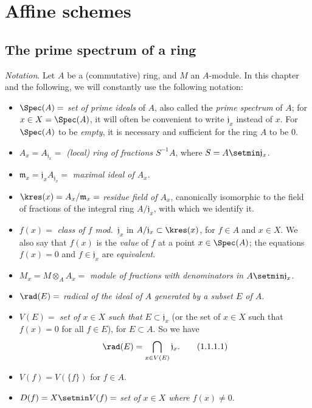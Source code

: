 \setcounter{section}{0}
\section{Affine schemes}
\label{section:I.1}

\setcounter{subsection}{0}
\subsection{The prime spectrum of a ring}
\label{subsection:I.1.1}

\begin{env}[1.1.1]
\label{I.1.1.1}
\emph{Notation}. Let $A$ be a (commutative) ring, and $M$ an $A$-module.
In this chapter and the following, we will constantly use the following notation:
\begin{itemize}
  \item $\Spec(A)=$ \emph{set of prime ideals} of $A$, also called the \emph{prime spectrum} of $A$; for $x\in X=\Spec(A)$, it will often be convenient to write $\mathfrak{j}_x$ instead of $x$.
    For $\Spec(A)$ to be \emph{empty}, it is necessary and sufficient for the ring $A$ to be $0$.
  \item $A_x=A_{\mathfrak{j}_x}=$ \emph{(local) ring of fractions $S^{-1}A$}, where $S=A\setmin\mathfrak{j}_x$.
  \item $\mathfrak{m}_x=\mathfrak{j}_x A_{\mathfrak{j}_x}=$ \emph{maximal ideal of $A_x$}.
  \item $\kres(x)=A_x/\mathfrak{m}_x=$ \emph{residue field of $A_x$}, canonically isomorphic to the field of fractions of the integral ring $A/\mathfrak{j}_x$, with which we identify it.
  \item $f(x)=$ \emph{class of $f$ mod.~$\mathfrak{j}_x$} in $A/\mathfrak{j}_x\subset\kres(x)$, for $f\in A$ and $x\in X$.
    We also say that $f(x)$ is the \emph{value} of $f$ at a point $x\in\Spec(A)$; the equations $f(x)=0$ and $f\in\mathfrak{j}_x$ are \emph{equivalent}.
  \item $M_x=M\otimes_A A_x=$ \emph{module of fractions with denominators in $A\setmin\mathfrak{j}_x$}.
  \item $\rad(E)=$ \emph{radical of the ideal of $A$ generated by a subset $E$ of $A$}.
  \item $V(E)=$ \emph{set of $x\in X$ such that $E\subset\mathfrak{j}_x$} (or the set of $x\in X$ such that $f(x)=0$ for all $f\in E$), for $E\subset A$.
    So we have
    \[
    \label{I.1.1.1.1}
      \rad(E)=\bigcap_{x\in V(E)}\mathfrak{j}_x.
      \tag{1.1.1.1}
    \]
  \item $V(f)=V(\{f\})$ for $f\in A$.
  \item $D(f)=X\setmin V(f)=$ \emph{set of $x\in X$ where $f(x)\neq 0$}.
\end{itemize}
\end{env}

